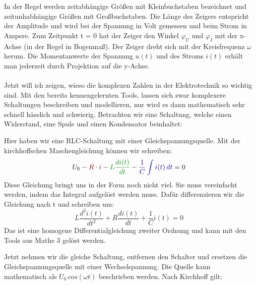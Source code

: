 \documentclass{article}
\begin{document}
\begin{mdframed}
\vspace{1\baselineskip}
\justify
In der Regel werden zeitabhängige Größen mit Kleinbuchstaben bezeichnet und zeitunhabhängige Größen mit Großbuchstaben. Die Länge des Zeigers entspricht der Amplitude und wird bei der Spannung in Volt gemessen und beim Strom in Ampere. Zum Zeitpunkt t = 0 hat der Zeiger den Winkel $\varphi_U$ und $\varphi_I$ mit der x-Achse (in der Regel in Bogenmaß). Der Zeiger dreht sich mit der Kreisfrequenz $\omega$ herum. Die Momentanwerte der Spannung $u(t)$ und des Stroms $i(t)$ erhält man jederzeit durch Projektion auf die y-Achse. \\
\justify
\vspace{2\baselineskip}
\\
\vspace{0.7\baselineskip}
\justify
Jetzt will ich zeigen, wieso die komplexen Zahlen in der Elektrotechnik so wichtig sind. Mit den bereits kennengelernten Tools, lassen sich zwar komplexere Schaltungen beschreiben und modellieren, nur wird es dann mathematisch sehr schnell hässlich und schwierig. Betrachten wir eine Schaltung, welche einen Widerstand, eine Spule und einen Kondensator beinhaltet:\\
\justify
\centering
\raisebox{-0.5\height}{}
\hspace{2\baselineskip}
\begin{minipage}{0.6\textwidth}
\justify
Hier haben wir eine RLC-Schaltung mit einer Gleichspannungsquelle. Mit der kirchhoffschen Maschengleichung können wir schreiben:
\[U_0 - \textcolor{red!50!black}{R \cdot i} - \textcolor{green!50!black}{L\frac{di(t)}{dt}} - \textcolor{blue!50!black}{\frac{1}{C}\int i(t)\,dt} = 0\]
Diese Gleichung bringt uns in der Form noch nicht viel. Sie muss vereinfacht werden, indem das Integral aufgelöst werden muss. Dafür differenzieren wir die Gleichung nach t und schreiben um:
\[L\frac{d^2i(t)}{dt^2}+R\frac{di(t)}{dt}+\frac{1}{C}i(t) = 0\]
Das ist eine homogene Differentialgleichung zweiter Ordnung und kann mit den Tools aus Mathe 3 gelöst werden.
\vspace{1\baselineskip}
\end{minipage}
\begin{minipage}{0.55\textwidth}
Jetzt nehmen wir die gleiche Schaltung, entfernen den Schalter und ersetzen die Gleichspannungsquelle mit einer Wechselspannung. Die Quelle kann mathematisch als $U_0 \,cos(\omega t)$ beschrieben werden. Nach Kirchhoff gilt:

\end{minipage}
\end{mdframed}
\end{document}

